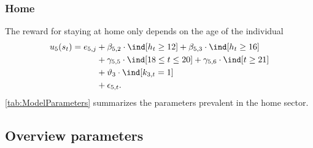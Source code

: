 \FloatBarrier\subsubsection{Home}
The reward for staying at home only depends on the age of the individual
%
\begin{align}
    u_5(s_t) =  e_{5,j} & + \beta_{5,2} \cdot \ind[h_t \geq 12] + \beta_{5,3} \cdot \ind[h_t \geq 16] 			 \nonumber \\
    							   & + \gamma_{5,5} \cdot \ind[18 \leq t \leq 20] + \gamma_{5,6} \cdot \ind[t \geq 21] \nonumber \\
    							   & + \vartheta_3 \cdot \ind[k_{3,t} = 1]  \nonumber \\
    							   & + \epsilon_{5,t}.
\end{align}
%
\autoref{tab:ModelParameters} summarizes the parameters prevalent in the home sector.

\clearpage 

\FloatBarrier\subsection{Overview parameters}



\clearpage